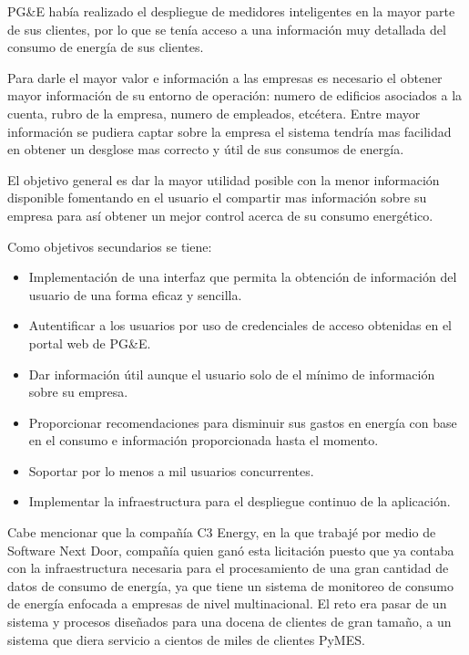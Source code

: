 \documentclass{article}
\begin{document}
PG\&E había realizado el despliegue de medidores inteligentes en la
mayor parte de sus clientes, por lo que se tenía acceso a una información
muy detallada del consumo de energía de sus clientes.

Para darle el mayor valor e información a las empresas es necesario el
obtener mayor información de su entorno de operación: numero
de edificios asociados a la cuenta, rubro de la empresa, numero de
empleados, etcétera. Entre mayor información se pudiera captar sobre la
empresa el sistema tendría mas facilidad en obtener un desglose
mas correcto y útil de sus consumos de energía.

El objetivo general es dar la mayor utilidad posible con la menor
información disponible fomentando en el usuario el compartir mas
información sobre su empresa para así obtener un mejor control
acerca de su consumo energético.

Como objetivos secundarios se tiene:
\begin{itemize}
\item Implementación de una interfaz que permita la obtención
  de información del usuario de una forma eficaz y sencilla.
\item Autentificar a los usuarios por uso de credenciales de acceso
  obtenidas en el portal web de PG\&E.
\item Dar información útil aunque el usuario solo de
  el mínimo de información sobre su empresa.
\item Proporcionar recomendaciones para disminuir sus
  gastos en energía con base en el consumo e información proporcionada
  hasta el momento.
\item Soportar por lo menos a mil usuarios concurrentes.
\item Implementar la infraestructura para el despliegue continuo de la
  aplicación. 
\end{itemize}

Cabe mencionar que la compañía C3 Energy, en la que trabajé
por medio de Software Next Door, compañía quien ganó esta licitación puesto
que ya contaba con la infraestructura necesaria para el procesamiento
de una gran cantidad de datos de consumo de energía, ya que tiene un sistema
de monitoreo de consumo de energía enfocada a empresas de nivel
multinacional. El reto era pasar de un sistema y procesos diseñados
para una docena de clientes de gran tamaño, a un sistema que diera
servicio a cientos de miles de clientes PyMES.
\end{document}
